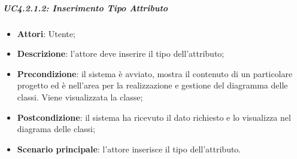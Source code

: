 \subparagraph{UC4.2.1.2: Inserimento Tipo Attributo}
\label{UC4.2.1.2}
\begin{itemize}
	\item \textbf{Attori}: Utente;
	\item \textbf{Descrizione}: l'attore deve inserire il tipo dell'attributo;
	\item \textbf{Precondizione}: il sistema è avviato, mostra il contenuto di un particolare progetto ed è nell'area per la realizzazione e gestione del diagramma delle classi. Viene visualizzata la classe;
	\item \textbf{Postcondizione}: il sistema ha ricevuto il dato richiesto e lo visualizza nel diagrama delle classi;
	\item \textbf{Scenario principale}: l'attore inserisce il tipo dell'attributo.
\end{itemize}

